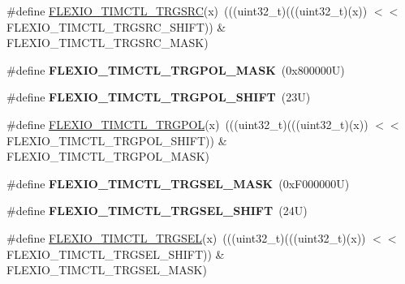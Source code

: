 \begin{DoxyCompactItemize}
\item 
\#define \mbox{\hyperlink{group___f_l_e_x_i_o___register___masks_gab0bae4339f9edb689f91e83191e1775b}{F\+L\+E\+X\+I\+O\+\_\+\+T\+I\+M\+C\+T\+L\+\_\+\+T\+R\+G\+S\+RC}}(x)~(((uint32\+\_\+t)(((uint32\+\_\+t)(x)) $<$$<$ F\+L\+E\+X\+I\+O\+\_\+\+T\+I\+M\+C\+T\+L\+\_\+\+T\+R\+G\+S\+R\+C\+\_\+\+S\+H\+I\+FT)) \& F\+L\+E\+X\+I\+O\+\_\+\+T\+I\+M\+C\+T\+L\+\_\+\+T\+R\+G\+S\+R\+C\+\_\+\+M\+A\+SK)
\item 
\mbox{\label{group___f_l_e_x_i_o___register___masks_ga36897cc3c3c3534e3b517b7a3579f5d8}} 
\#define {\bfseries F\+L\+E\+X\+I\+O\+\_\+\+T\+I\+M\+C\+T\+L\+\_\+\+T\+R\+G\+P\+O\+L\+\_\+\+M\+A\+SK}~(0x800000\+U)
\item 
\mbox{\label{group___f_l_e_x_i_o___register___masks_gad1ddac52643e08f20d4efceda008b619}} 
\#define {\bfseries F\+L\+E\+X\+I\+O\+\_\+\+T\+I\+M\+C\+T\+L\+\_\+\+T\+R\+G\+P\+O\+L\+\_\+\+S\+H\+I\+FT}~(23\+U)
\item 
\#define \mbox{\hyperlink{group___f_l_e_x_i_o___register___masks_ga5840f8c29b208ea07d4dcdb7a17bfc4a}{F\+L\+E\+X\+I\+O\+\_\+\+T\+I\+M\+C\+T\+L\+\_\+\+T\+R\+G\+P\+OL}}(x)~(((uint32\+\_\+t)(((uint32\+\_\+t)(x)) $<$$<$ F\+L\+E\+X\+I\+O\+\_\+\+T\+I\+M\+C\+T\+L\+\_\+\+T\+R\+G\+P\+O\+L\+\_\+\+S\+H\+I\+FT)) \& F\+L\+E\+X\+I\+O\+\_\+\+T\+I\+M\+C\+T\+L\+\_\+\+T\+R\+G\+P\+O\+L\+\_\+\+M\+A\+SK)
\item 
\mbox{\label{group___f_l_e_x_i_o___register___masks_ga693b2171f1c7488ea8445780239ba33f}} 
\#define {\bfseries F\+L\+E\+X\+I\+O\+\_\+\+T\+I\+M\+C\+T\+L\+\_\+\+T\+R\+G\+S\+E\+L\+\_\+\+M\+A\+SK}~(0x\+F000000\+U)
\item 
\mbox{\label{group___f_l_e_x_i_o___register___masks_gaa122c02b58941c9e7e9127d917e59d9a}} 
\#define {\bfseries F\+L\+E\+X\+I\+O\+\_\+\+T\+I\+M\+C\+T\+L\+\_\+\+T\+R\+G\+S\+E\+L\+\_\+\+S\+H\+I\+FT}~(24\+U)
\item 
\#define \mbox{\hyperlink{group___f_l_e_x_i_o___register___masks_gaaa6475c8f4188ff4f9cb02c6de1959d9}{F\+L\+E\+X\+I\+O\+\_\+\+T\+I\+M\+C\+T\+L\+\_\+\+T\+R\+G\+S\+EL}}(x)~(((uint32\+\_\+t)(((uint32\+\_\+t)(x)) $<$$<$ F\+L\+E\+X\+I\+O\+\_\+\+T\+I\+M\+C\+T\+L\+\_\+\+T\+R\+G\+S\+E\+L\+\_\+\+S\+H\+I\+FT)) \& F\+L\+E\+X\+I\+O\+\_\+\+T\+I\+M\+C\+T\+L\+\_\+\+T\+R\+G\+S\+E\+L\+\_\+\+M\+A\+SK)
\end{DoxyCompactItemize}
